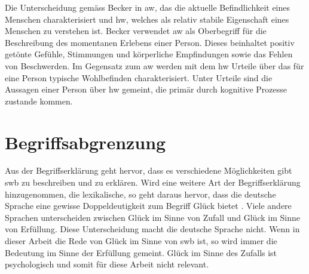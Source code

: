 Die Unterscheidung gemäss Becker \cite{Becker:1994} in \gls{aw}, das die aktuelle Befindlichkeit eines Menschen charakterisiert und \gls{hw}, welches als relativ stabile Eigenschaft eines Menschen zu verstehen ist. Becker verwendet \gls{aw} als Oberbegriff für die Beschreibung des momentanen Erlebens einer Person. Dieses beinhaltet positiv getönte Gefühle, Stimmungen und körperliche Empfindungen sowie das Fehlen von Beschwerden. Im Gegensatz zum \gls{aw} werden mit dem \gls{hw} Urteile über das für eine Person typische Wohlbefinden charakterisiert. Unter Urteile sind die Aussagen einer Person über \gls{hw} gemeint, die primär durch kognitive Prozesse zustande kommen.

\section{Begriffsabgrenzung}\label{abgrenzung}
Aus der Begriffserklärung geht hervor, dass es verschiedene Möglichkeiten gibt \gls{swb} zu beschreiben und zu erklären. Wird eine weitere Art der Begriffserklärung hinzugenommen, die lexikalische, so geht daraus hervor, dass die deutsche Sprache eine gewisse Doppeldeutigkeit zum Begriff Glück bietet \cite{Mayring:1991}. Viele andere Sprachen unterscheiden zwischen Glück im Sinne von Zufall und Glück im Sinne von Erfüllung. Diese Unterscheidung macht die deutsche Sprache nicht. Wenn in dieser Arbeit die Rede von Glück im Sinne von \gls{swb} ist, so wird immer die Bedeutung im Sinne der Erfüllung gemeint. Glück im Sinne des Zufalls ist psychologisch und somit für diese Arbeit nicht relevant.

